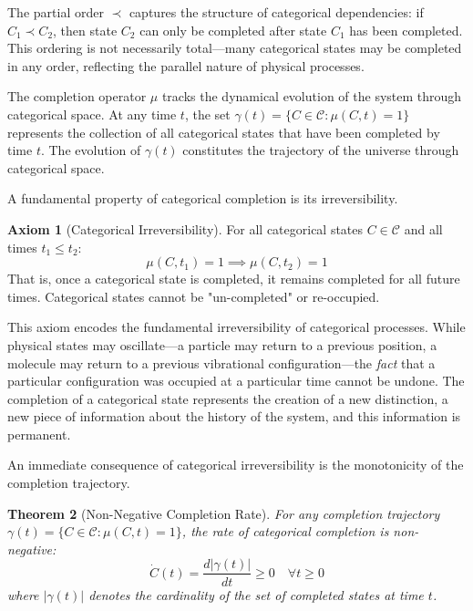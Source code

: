 \documentclass[12pt,a4paper]{article}
\newtheorem{theorem}{Theorem}[section]
\theoremstyle{definition}
\newtheorem{axiom}[theorem]{Axiom}
\theoremstyle{remark}
\begin{document}
The partial order $\prec$ captures the structure of categorical dependencies: if $C_1 \prec C_2$, then state $C_2$ can only be completed after state $C_1$ has been completed. This ordering is not necessarily total—many categorical states may be completed in any order, reflecting the parallel nature of physical processes.

The completion operator $\mu$ tracks the dynamical evolution of the system through categorical space. At any time $t$, the set $\gamma(t) = \{C \in \mathcal{C} : \mu(C, t) = 1\}$ represents the collection of all categorical states that have been completed by time $t$. The evolution of $\gamma(t)$ constitutes the trajectory of the universe through categorical space.

A fundamental property of categorical completion is its irreversibility.

\begin{axiom}[Categorical Irreversibility]
\label{axiom:cat_irreversibility}
For all categorical states $C \in \mathcal{C}$ and all times $t_1 \leq t_2$:
\begin{equation}
\mu(C, t_1) = 1 \implies \mu(C, t_2) = 1
\end{equation}
That is, once a categorical state is completed, it remains completed for all future times. Categorical states cannot be "un-completed" or re-occupied.
\end{axiom}

This axiom encodes the fundamental irreversibility of categorical processes. While physical states may oscillate—a particle may return to a previous position, a molecule may return to a previous vibrational configuration—the \emph{fact} that a particular configuration was occupied at a particular time cannot be undone. The completion of a categorical state represents the creation of a new distinction, a new piece of information about the history of the system, and this information is permanent.

An immediate consequence of categorical irreversibility is the monotonicity of the completion trajectory.

\begin{theorem}[Non-Negative Completion Rate]
\label{thm:nonneg_rate}
For any completion trajectory $\gamma(t) = \{C \in \mathcal{C} : \mu(C, t) = 1\}$, the rate of categorical completion is non-negative:
\begin{equation}
\dot{C}(t) = \frac{d|\gamma(t)|}{dt} \geq 0 \quad \forall t \geq 0
\end{equation}
where $|\gamma(t)|$ denotes the cardinality of the set of completed states at time $t$.
\end{theorem}
\end{document}
